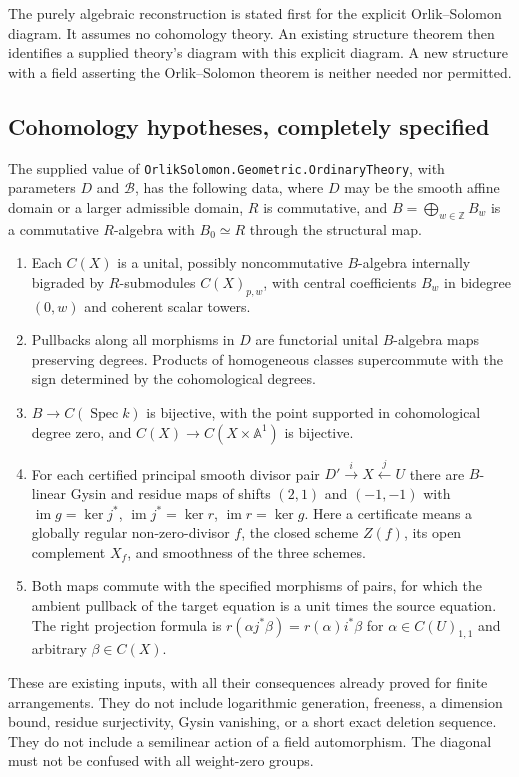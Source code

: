 \documentclass[11pt]{article}
\theoremstyle{remark}\newtheorem{remark}[theorem]{Remark}
\newcommand{\A}{\mathbb A}
\newcommand{\Z}{\mathbb Z}
\newcommand{\im}{\operatorname{im}}
\newcommand{\code}[1]{\nolinkurl{#1}}
\begin{document}
The purely algebraic reconstruction is stated first for the explicit
Orlik--Solomon diagram. It assumes no cohomology theory. An existing
structure theorem then identifies a supplied theory's diagram with
this explicit diagram. A new structure with a field asserting the
Orlik--Solomon theorem is neither needed nor permitted.

\subsection{Cohomology hypotheses, completely specified}

The supplied value of
\code{OrlikSolomon.Geometric.OrdinaryTheory}, with parameters
$D$ and $\mathcal B$, has the following
data, where $D$ may be the smooth affine domain or a larger admissible
domain, $R$ is commutative, and $B=\bigoplus_{w\in\Z}B_w$ is a
commutative $R$-algebra with $B_0\simeq R$ through the structural map.
\begin{enumerate}[label=\textbf{C\arabic*.},leftmargin=*]
\item Each $C(X)$ is a unital, possibly noncommutative $B$-algebra
internally bigraded by $R$-submodules $C(X)_{p,w}$, with central
coefficients $B_w$ in bidegree $(0,w)$ and coherent scalar towers.
\item Pullbacks along all morphisms in $D$ are functorial unital
$B$-algebra maps preserving degrees. Products of homogeneous classes
supercommute with the sign determined by the cohomological degrees.
\item $B\to C(\operatorname{Spec}k)$ is bijective, with the point
supported in cohomological degree zero, and
$C(X)\to C(X\times\A^1)$ is bijective.
\item For each certified principal smooth divisor pair
$D'\xrightarrow{i}X\xleftarrow{j}U$ there are $B$-linear Gysin and
residue maps of shifts $(2,1)$ and $(-1,-1)$ with
$\im g=\ker j^*$, $\im j^*=\ker r$, $\im r=\ker g$.
Here a certificate means a globally regular non-zero-divisor $f$,
the closed scheme $Z(f)$, its open complement $X_f$, and smoothness
of the three schemes.
\item Both maps commute with the specified morphisms of pairs, for
which the ambient pullback of the target equation is a unit times
the source equation. The right projection formula is
$r(\alpha j^*\beta)=r(\alpha)i^*\beta$ for
$\alpha\in C(U)_{1,1}$ and arbitrary $\beta\in C(X)$.
\end{enumerate}
These are existing inputs, with all their consequences already proved
for finite arrangements. They do not include logarithmic generation,
freeness, a dimension bound, residue surjectivity, Gysin vanishing, or
a short exact deletion sequence. They do not include a semilinear
action of a field automorphism. The diagonal must not be confused
with all weight-zero groups.
\end{document}
